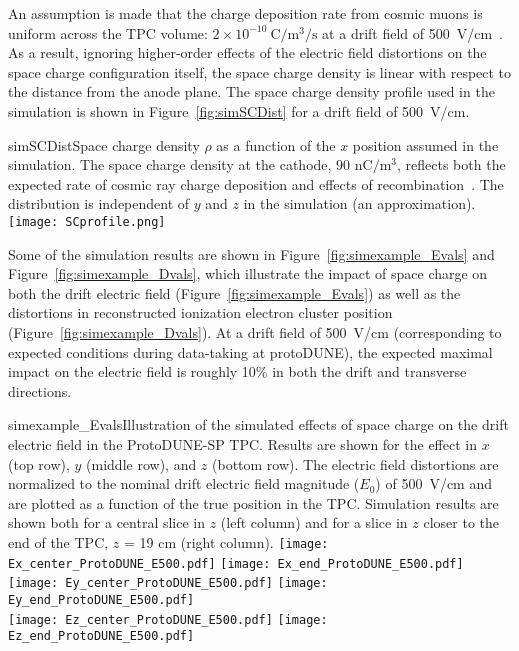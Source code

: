 An assumption is made that the charge deposition rate from cosmic muons is uniform across the TPC volume:  $2{\times}10^{-10}~\mathrm{C}/\mathrm{m}^{3}/\mathrm{s}$ at a drift field of 500~V/cm~\cite{KirkSCE}.  As a result, ignoring higher-order effects of the electric field distortions on the space charge configuration itself, the space charge density is linear with respect to the distance from the anode plane.  The space charge density profile used in the simulation is shown in Figure~\ref{fig:simSCDist} for a drift field of 500~V/cm.

\begin{cdrfigure}{simSCDist}{Space charge density $\rho$ as a function of the $x$ position assumed in the simulation. The space charge density at the cathode, $90$ $\mathrm{nC}/\mathrm{m}^3$, reflects both the expected rate of cosmic ray charge deposition and effects of recombination~\cite{KirkSCE}. The distribution is independent of $y$ and $z$ in the simulation (an approximation).}
\texttt{[image: SCprofile.png]}
\end{cdrfigure}


Some of the simulation results are shown in Figure~\ref{fig:simexample_Evals} and Figure~\ref{fig:simexample_Dvals}, which illustrate the impact of space charge on both the drift electric field (Figure~\ref{fig:simexample_Evals}) as well as the distortions in reconstructed ionization electron cluster position (Figure~\ref{fig:simexample_Dvals}).  At a drift field of 500~V/cm (corresponding to expected conditions during data-taking at protoDUNE), the expected maximal impact on the electric field is roughly 10\% in both the drift and transverse directions.

\begin{cdrfigure}{simexample_Evals}{Illustration of the simulated effects of space charge on the drift electric field in the ProtoDUNE-SP TPC.  Results are shown for the effect in $x$ (top row), $y$ (middle row), and $z$ (bottom row).  The electric field distortions are normalized to the nominal drift electric field magnitude ($E_{0}$) of 500~V/cm and are plotted as a function of the true position in the TPC.  Simulation results are shown both for a central slice in $z$ (left column) and for a slice in $z$ closer to the end of the TPC, $z$ = 19 cm (right column).}
\texttt{[image: Ex\_center\_ProtoDUNE\_E500.pdf]}
\texttt{[image: Ex\_end\_ProtoDUNE\_E500.pdf]}
\\
\texttt{[image: Ey\_center\_ProtoDUNE\_E500.pdf]}
\texttt{[image: Ey\_end\_ProtoDUNE\_E500.pdf]}
\\
\texttt{[image: Ez\_center\_ProtoDUNE\_E500.pdf]}
\texttt{[image: Ez\_end\_ProtoDUNE\_E500.pdf]}
\end{cdrfigure}


